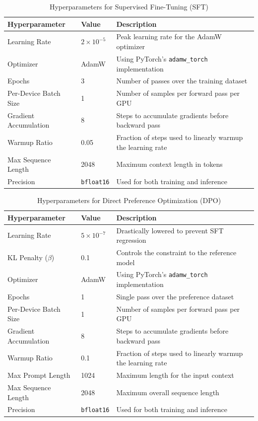 \documentclass{article}
\theoremstyle{plain}
\theoremstyle{definition}
\theoremstyle{remark}
\begin{document}
\begin{table}[h]
\centering
\caption{Hyperparameters for Supervised Fine-Tuning (SFT)}
\begin{tabular}{lll}
\toprule
\textbf{Hyperparameter} & \textbf{Value} & \textbf{Description} \\
\midrule
Learning Rate & $2 \times 10^{-5}$ & Peak learning rate for the AdamW optimizer \\
Optimizer & AdamW & Using PyTorch's \texttt{adamw\_torch} implementation \\
Epochs & 3 & Number of passes over the training dataset \\
Per-Device Batch Size & 1 & Number of samples per forward pass per GPU \\
Gradient Accumulation & 8 & Steps to accumulate gradients before backward pass \\
Warmup Ratio & 0.05 & Fraction of steps used to linearly warmup the learning rate \\
Max Sequence Length & 2048 & Maximum context length in tokens \\
Precision & \texttt{bfloat16} & Used for both training and inference \\
\bottomrule
\end{tabular}
\label{tab:sft_hyperparams}
\end{table}

\begin{table}[h]
\centering
\caption{Hyperparameters for Direct Preference Optimization (DPO)}
\begin{tabular}{lll}
\toprule
\textbf{Hyperparameter} & \textbf{Value} & \textbf{Description} \\
\midrule
Learning Rate & $5 \times 10^{-7}$ & Drastically lowered to prevent SFT regression \\
KL Penalty ($\beta$) & 0.1 & Controls the constraint to the reference model \\
Optimizer & AdamW & Using PyTorch's \texttt{adamw\_torch} implementation \\
Epochs & 1 & Single pass over the preference dataset \\
Per-Device Batch Size & 1 & Number of samples per forward pass per GPU \\
Gradient Accumulation & 8 & Steps to accumulate gradients before backward pass \\
Warmup Ratio & 0.1 & Fraction of steps used to linearly warmup the learning rate \\
Max Prompt Length & 1024 & Maximum length for the input context \\
Max Sequence Length & 2048 & Maximum overall sequence length \\
Precision & \texttt{bfloat16} & Used for both training and inference \\
\bottomrule
\end{tabular}
\label{tab:dpo_hyperparams}
\end{table}
\end{document}
